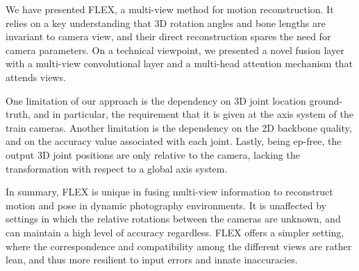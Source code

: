 
We have presented FLEX, a multi-view method for motion reconstruction. 
It relies on a key understanding that 3D rotation angles and bone lengths are invariant to camera view, and their direct reconstruction spares the need for camera parameters. 
%
On a technical viewpoint, we presented a novel fusion layer with a multi-view convolutional layer and a multi-head attention mechanism that attends views.

One limitation of our approach is the dependency on 3D joint location ground-truth, and in particular, the requirement that it is given at the axis system of the train cameras. 
Another limitation is the dependency on the 2D backbone quality, and on the accuracy value associated with each joint.
% 
Lastly, being ep-free, the output 3D joint positions are only relative to the camera, lacking the transformation with respect to a global axis system.  


In summary, FLEX is unique in fusing multi-view information to reconstruct motion and pose in dynamic photography environments. %
It is unaffected by settings in which the relative rotations between the cameras are unknown, 
and can maintain a high level of accuracy regardless.
%
FLEX offers a simpler setting, where the correspondence and compatibility among the different views are rather lean, and thus more resilient to input errors and innate inaccuracies.


